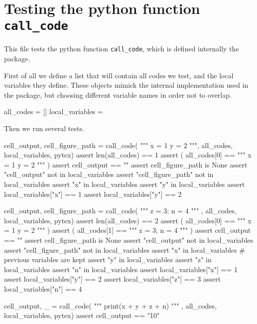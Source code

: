 \documentclass[oneside]{book}
\begin{document}
\chapter{Testing the python function \texttt{call\_code}}

This file tests the python function \texttt{call\_code}, which is defined internally the package.

First of all we define a list that will contain all codes we test, and the local variables they define. These objects mimick the internal implementation used in the package, but choosing different variable names in order not to overlap.

\begin{pycell}
all_codes = []
local_variables = {}
\end{pycell}

Then we run several tests.

\begin{pycell}
cell_output, cell_figure_path = call_code(
"""
x = 1
y = 2
""",
all_codes, local_variables, pytex)
assert len(all_codes) == 1
assert (
    all_codes[0] == """
x = 1
y = 2
"""
)
assert cell_output == ""
assert cell_figure_path is None
assert "cell_output" not in local_variables
assert "cell_figure_path" not in local_variables
assert "x" in local_variables
assert "y" in local_variables
assert local_variables["x"] == 1
assert local_variables["y"] == 2
\end{pycell}

\begin{pycell}
cell_output, cell_figure_path = call_code(
"""
z = 3; n = 4
"""
,
all_codes, local_variables, pytex)
assert len(all_codes) == 2
assert (
    all_codes[0] == """
x = 1
y = 2
"""
)
assert (
    all_codes[1] == """
z = 3; n = 4
"""
)
assert cell_output == ""
assert cell_figure_path is None
assert "cell_output" not in local_variables
assert "cell_figure_path" not in local_variables
assert "x" in local_variables  # previous variables are kept
assert "y" in local_variables
assert "z" in local_variables
assert "n" in local_variables
assert local_variables["x"] == 1
assert local_variables["y"] == 2
assert local_variables["z"] == 3
assert local_variables["n"] == 4
\end{pycell}

\begin{pycell}
cell_output, _ = call_code(
"""
print(x + y + z + n)
"""
,
all_codes, local_variables, pytex)
assert cell_output == "10"
\end{pycell}
\end{document}
